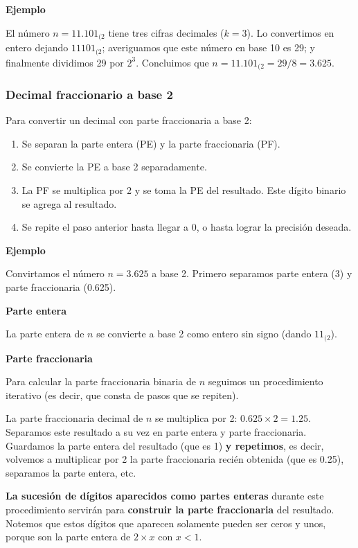 \documentclass[spanish,A4,]{article}
\begin{document}
\textbf{Ejemplo}

El número $n = 11.101_{(2}$ tiene tres cifras decimales ($k = 3$). Lo
convertimos en entero dejando $11101_{(2}$; averiguamos que este número
en base 10 es 29; y finalmente dividimos 29 por $2^3$. Concluimos que
$n = 11.101_{(2} = 29/8 = 3.625$.

\subsubsection{Decimal fraccionario a base
2}\label{decimal-fraccionario-a-base-2}

Para convertir un decimal con parte fraccionaria a base 2:

\begin{enumerate}
\def\labelenumi{\arabic{enumi}.}
\itemsep1pt\parskip0pt
\item
  Se separan la parte entera (PE) y la parte fraccionaria (PF).
\item
  Se convierte la PE a base 2 separadamente.
\item
  La PF se multiplica por 2 y se toma la PE del resultado. Este dígito
  binario se agrega al resultado.
\item
  Se repite el paso anterior hasta llegar a 0, o hasta lograr la
  precisión deseada.
\end{enumerate}

\textbf{Ejemplo}

Convirtamos el número $n = 3.625$ a base 2. Primero separamos parte
entera (3) y parte fraccionaria (0.625).

\textbf{Parte entera}

La parte entera de $n$ se convierte a base 2 como entero sin signo
(dando $11_{(2}$).

\textbf{Parte fraccionaria}

Para calcular la parte fraccionaria binaria de $n$ seguimos un
procedimiento iterativo (es decir, que consta de pasos que se repiten).

La parte fraccionaria decimal de $n$ se multiplica por 2:
$0.625 \times 2 = 1.25$. Separamos este resultado a su vez en parte
entera y parte fraccionaria. Guardamos la parte entera del resultado
(que es 1) \textbf{y repetimos}, es decir, volvemos a multiplicar por 2
la parte fraccionaria recién obtenida (que es 0.25), separamos la parte
entera, etc.

\textbf{La sucesión de dígitos aparecidos como partes enteras} durante
este procedimiento servirán para \textbf{construir la parte
fraccionaria} del resultado. Notemos que estos dígitos que aparecen
solamente pueden ser ceros y unos, porque son la parte entera de
$2\times x$ con $x < 1$.
\end{document}
